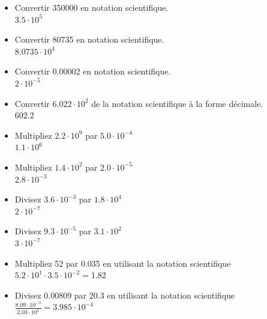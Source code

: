 \documentclass[
  11pt,
  a4paper,
  openany]{book}
\providecommand{\tightlist}{%
  \setlength{\itemsep}{0pt}\setlength{\parskip}{0pt}}
\begin{document}
\begin{Answer}

\begin{itemize}
\tightlist
\item
  Convertir 350000 en notation scientifique.\\
  \(3.5 \cdot 10^5\)
\item
  Convertir 80735 en notation scientifique.\\
  \(8.0735 \cdot 10^4\)
\item
  Convertir 0.00002 en notation scientifique.\\
  \(2 \cdot 10^{-5}\)
\item
  Convertir \(6.022 \cdot 10^2\) de la notation scientifique à la forme décimale.\\
  \(602.2\)
\item
  Multipliez \(2.2 \cdot 10^9\) par \(5.0 \cdot 10^{-4}\)\\
  \(1.1 \cdot 10^6\)
\item
  Multipliez \(1.4 \cdot 10^2\) par \(2.0 \cdot 10^{-5}\)\\
  \(2.8 \cdot 10^{-3}\)
\item
  Divisez \(3.6 \cdot 10^{-3}\) par \(1.8 \cdot 10^4\)\\
  \(2 \cdot 10^{-7}\)
\item
  Divisez \(9.3 \cdot 10^{-5}\) par \(3.1 \cdot 10^2\)\\
  \(3 \cdot 10^{-7}\)
\item
  Multipliez 52 par 0.035 en utilisant la notation scientifique\\
  \(5.2 \cdot 10^{1} \cdot 3.5 \cdot 10^{-2} = 1.82\)
\item
  Divisez 0.00809 par 20.3 en utilisant la notation scientifique\\
  \(\frac{8.09 \cdot 10^{-3}}{2.03 \cdot 10^1} = 3.985 \cdot 10^{-4}\)
\end{itemize}

\end{Answer}
\end{document}
